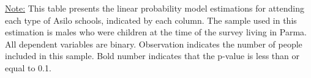 \begin{footnotesize}
\noindent\underline{Note:} This table presents the linear probability model estimations for attending each type of Asilo schools, indicated by each column. The sample used in this estimation is males who were children at the time of the survey living in Parma. All dependent variables are binary. Observation indicates the number of people included in this sample. Bold number indicates that the p-value is less than or equal to 0.1.
\end{footnotesize}

